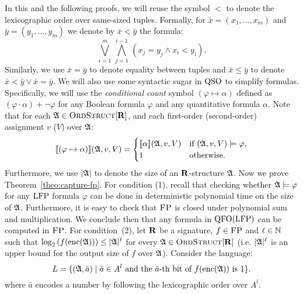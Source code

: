 In this and the following proofs, we will reuse the symbol $<$ to denote the lexicographic order over same-sized tuples. 
Formally, for $\bar{x} = (x_1,\ldots,x_m)$ and $\bar{y} = (y_1,\ldots,y_m)$ we denote by $\bar{x} < \bar{y}$ the formula:
$$
\bigvee_{i = 1}^m \, \bigwedge_{j = 1}^{i-1} \, (x_j = y_j \wedge x_i < y_i).
$$
Similarly, we use $\bar{x} = \bar{y}$ to denote equality between tuples and $\bar{x} \leq \bar{y}$  to denote $\bar{x} < \bar{y} \vee \bar{x} = \bar{y}$.
We will also use some syntactic sugar in ${\rm QSO}$ to simplify formulas. 
Specifically, we will use the {\em conditional count} symbol $(\varphi \mapsto \alpha)$ defined as $ (\varphi\cdot\alpha) + \neg\varphi$ for any Boolean formula $\varphi$ and any quantitative formula $\alpha$. 
Note that for each $\mathfrak{A} \in \text{\sc OrdStruct}[\mathbf{R}]$, and each first-order (second-order) assignment $v$ ($V$) over $\mathfrak{A}$:
\[
{\llbracket{}{(\varphi \mapsto \alpha)}\rrbracket}(\mathfrak{A},v,V) = 
\begin{cases}
{\llbracket{}{\alpha}\rrbracket}(\mathfrak{A},v,V) &\text{if } (\mathfrak{A},v,V)\models\varphi,\\
1 &\text{otherwise}.
\end{cases}
\]
Furthermore, we use $\vert \mathfrak{A} \vert$ to denote the size of an $\mathbf{R}$-structure $\mathfrak{A}$.
Now we prove Theorem~\ref{theo:capture-fp}. 
For condition (1), recall that checking whether $\mathfrak{A}\models\varphi$ for any ${\rm LFP}$ formula $\varphi$ can be done in deterministic polynomial time on the size of $\mathfrak{A}$\cite{I83}. 
Furthermore, it is easy to check that $\text{\sc FP}$ is closed under polynomial sum and multiplication. 
We conclude then that any formula in ${\rm QFO}({\rm LFP})$ can be computed in $\text{\sc FP}$.	
For condition~(2), let $\mathbf{R}$ be a signature, $f\in \text{\sc FP}$
and $\ell\in\mathbb{N}$ such that $\log_2\left(f({\rm enc}(\mathfrak{A})) \right) \leq \vert \mathfrak{A} \vert^\ell$ for every $\mathfrak{A}\in\text{\sc OrdStruct}[\mathbf{R}]$ (i.e. $\vert \mathfrak{A} \vert^\ell$ is an upper bound for the output size of $f$ over $\mathfrak{A}$).
Consider the language:
\[
L = \{(\mathfrak{A},\bar{a})\mid \bar{a} \in A^l \text{ and the } \bar{a}\text{-th bit of }f({\rm enc}(\mathfrak{A}))\text{ is 1}\}.
\]
where $\bar{a}$ encodes a number by following the lexicographic order over $A^l$.
